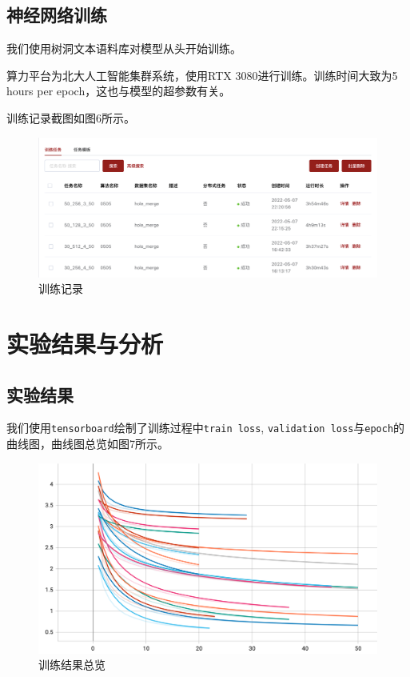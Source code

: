 \documentclass[12pt,a4paper]{article}
\begin{document}
\subsection{神经网络训练}
    我们使用树洞文本语料库对模型从头开始训练。
    
    算力平台为北大人工智能集群系统，使用RTX 3080进行训练。训练时间大致为5 hours per epoch，这也与模型的超参数有关。
    
    训练记录截图如图6所示。
    
    \begin{figure}[!h]
        \centering
        \includegraphics[width=1\textwidth]{图片4.png}
        \caption{训练记录}
    \end{figure}


\section{实验结果与分析}
\subsection{实验结果}
我们使用\verb|tensorboard|绘制了训练过程中\verb|train loss|, \verb|validation loss|与\verb|epoch|的曲线图，曲线图总览如图7所示。

\begin{figure}[!h]
        \centering
        \includegraphics[width=1\textwidth]{图片9.png}
        \caption{训练结果总览}
\end{figure}
\end{document}
